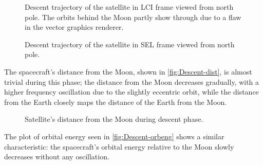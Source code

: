 \begin{figure}[h]
\centering
\def\svgwidth{\figurewidth}

\caption{Descent trajectory of the satellite in LCI frame viewed from north pole. The orbits behind the Moon partly show through due to a flaw in the vector graphics renderer.} \label{fig:Descent-3D-lci}
\end{figure}

\begin{figure}
\centering
\def\svgwidth{\figurewidth}

\caption{Descent trajectory of the satellite in SEL frame viewed from north pole.} \label{fig:Descent-3D-sel}
\end{figure}


The spacecraft's distance from the Moon, shown in \autoref{fig:Descent-dist}, is almost trivial during this phase; the distance from the Moon decreases gradually, with a higher frequency oscillation due to the slightly eccentric orbit, while the distance from the Earth closely maps the distance of the Earth from the Moon.

\begin{figure}
\centering
\def\svgwidth{\figurewidth}

\caption{Satellite's distance from the Moon during descent phase.} \label{fig:Descent-dist}
\end{figure}


The plot of orbital energy seen in \autoref{fig:Descent-orbeng} shows a similar characteristic: the spacecraft's orbital energy relative to the Moon slowly decreases without any oscillation.

